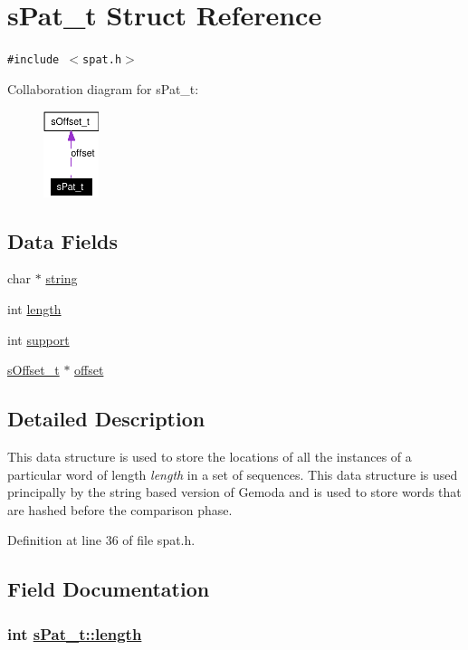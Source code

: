 \hypertarget{structsPat__t}{
\section{s\-Pat\_\-t Struct Reference}
\label{structsPat__t}
}
{\tt \#include $<$spat.h$>$}

Collaboration diagram for s\-Pat\_\-t:\begin{figure}[H]
\begin{center}
\leavevmode
\includegraphics[width=46pt]{structsPat__t__coll__graph}
\end{center}
\end{figure}
\subsection*{Data Fields}
\begin{CompactItemize}
\item 
char $\ast$ \hyperlink{structsPat__t_o0}{string}
\item 
int \hyperlink{structsPat__t_o1}{length}
\item 
int \hyperlink{structsPat__t_o2}{support}
\item 
\hyperlink{structsOffset__t}{s\-Offset\_\-t} $\ast$ \hyperlink{structsPat__t_o3}{offset}
\end{CompactItemize}


\subsection*{Detailed Description}
This data structure is used to store the locations of all the instances of a particular word of length {\em length\/} in a set of sequences. This data structure is used principally by the string based version of Gemoda and is used to store words that are hashed before the comparison phase.



Definition at line 36 of file spat.h.

\subsection*{Field Documentation}
\hypertarget{structsPat__t_o1}{
\subsubsection[length]{\setlength{\rightskip}{0pt plus 5cm}int \hyperlink{structsPat__t_o1}{s\-Pat\_\-t::length}}}
\label{structsPat__t_o1}


